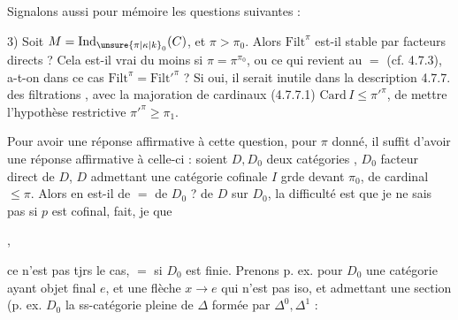 Signalons aussi pour mémoire les questions suivantes :

3) Soit $M=\mathrm{Ind}_{\unsure{\pi|\kappa|k}_0}(C)$, et $\pi>\pi_0$. Alors $\mathrm{Filt}^{\pi}$ est-il stable par facteurs directs ? Cela est-il vrai du moins si $\pi=\pi^{\pi_0}$, ou ce qui revient au $=$ (cf. 4.7.3), a-t-on dans ce cas $\mathrm{Filt}^{\pi}=\mathrm{Filt}'^{\pi}$ ? Si oui, il serait inutile dans la description 4.7.7. des filtrations , avec la majoration de cardinaux (4.7.7.1) $\mathrm{Card}\,I\leq\pi'^{\pi}$, de mettre l'hypothèse restrictive $\pi'^{\pi}\geq\pi_1$.

Pour avoir une réponse affirmative à cette question, pour $\pi$ donné, il suffit  d'avoir une réponse affirmative à celle-ci : soient $D,D_0$ deux catégories , $D_0$ facteur direct de $D$, $D$ admettant une catégorie cofinale $I$ grde devant $\pi_0$, de cardinal $\leq\pi$. Alors en est-il de $=$ de $D_0$ ?  de $D$ sur $D_0$, la difficulté est que je ne sais pas si $p$ est  cofinal,  fait, je  que


,

ce n'est pas tjrs le cas, $=$ si $D_0$ est finie. Prenons p. ex. pour $D_0$ une catégorie ayant objet final  $e$, et une flèche $x\longrightarrow e$ qui n'est pas iso, et admettant une section (p. ex. $D_0$ la ss-catégorie pleine de $\mathbb{\Delta}$ formée par $\mathbb{\Delta}^0,\mathbb{\Delta}^1$ :

